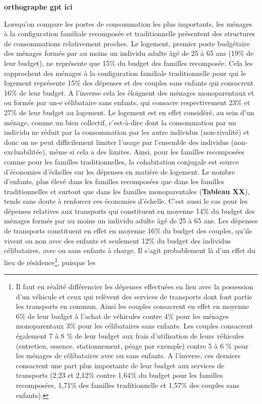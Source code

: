 \documentclass[
  12pt,
]{book}
\begin{document}
\textbf{orthographe gpt ici}

Lorsqu'on compare les postes de consommation les plus importants, les
ménages à la configuration familiale recomposée et traditionnelle
présentent des structures de consommations relativement proches. Le
logement, premier poste budgétaire des ménages formés par au moins un
individu adulte âgé de 25 à 65 ans (19\% de leur budget), ne représente
que 15\% du budget des familles recomposée. Cela les rapprochent des
ménages à la configuration familiale traditionnelle pour qui le logement
représente 15\% des dépenses et des couples sans enfants qui consacrent
16\% de leur budget. A l'inverse cela les éloignent des ménages
monoparentaux et ou formés par un-e célibataire sans enfants, qui
consacre respectivement 23\% et 27\% de leur budget au logement. Le
logement est en effet considéré, au sein d'un ménage, comme un bien
collectif, c'est-à-dire dont la consommation par un individu ne réduit
par la consommation par les autre individus (non-rivalité) et donc on ne
peut difficilement limiter l'usage par l'ensemble des individus
(non-excluabilitée), même si cela a des limites. Ainsi, pour les
familles recomposées comme pour les familles traditionnelles, la
cohabitation conjugale est source d'économies d'échelles sur les
dépenses en matière de logement. Le nombre d'enfants, plus élevé dans
les familles recomposées que dans les familles traditionnelles et
surtout que dans les familles monoparentales (\textbf{Tableau XX}),
tends sans doute à renforcer ces économies d'échelle. C'est aussi le cas
pour les dépenses relatives aux transports qui constituent en moyenne
14\% du budget des ménages formés par au moins un individu adulte âgé de
25 à 65 ans. Les dépenses de transports constituent en effet en moyenne
16\% du budget des couples, qu'ils vivent ou non avec des enfants et
seulement 12\% du budget des individus célibataires, avec ou sans
enfants à charge. Il s'agit probablement là d'un effet du lieu de
résidence\footnote{Il faut en réalité différencier les dépenses
  effectuées en lien avec la possession d'un véhicule et ceux qui
  relèvent des services de transports dont font partie les transports en
  commun. Ainsi les couples consacrent en effet en moyenne 6\% de leur
  budget à l'achat de véhicules contre 4\% pour les ménages
  monoparentaux 3\% pour les célibataires sans enfants. Les couples
  consacrent également 7 à 8 \% de leur budget aux frais d'utilisation
  de leurs véhicules (entretien, essence, stationnement, péage par
  exemple) contre 5 à 6 \% pour les ménages de célibataires avec ou sans
  enfants. A l'inverse, ces derniers consacrent une part plus importante
  de leur budget aux services de transports (2,23 et 2,12\% contre
  1,64\% du budget pour les familles recomposées, 1,71\% des familles
  traditionnelle et 1,57\% des couples sans enfants).}, puisque les
\end{document}
